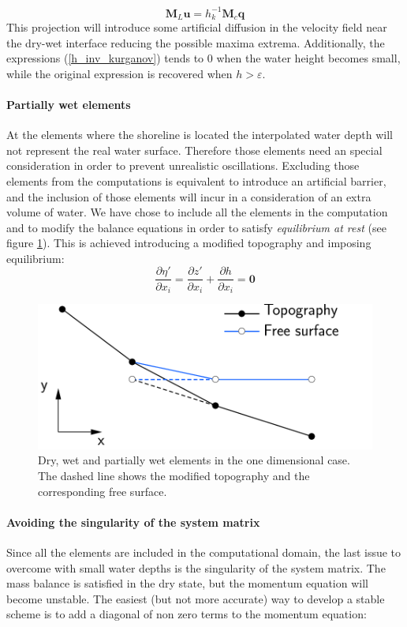 \documentclass[a4paper,12pt]{article}
\newcommand{\pder}[2]{\frac{\partial#1}{\partial#2}}
\begin{document}
\begin{equation}
\mathbf{M}_L \mathbf{u} = h^{-1}_k \mathbf{M}_c \mathbf{q}
\end{equation}
This projection will introduce some artificial diffusion in the velocity field near the dry-wet interface reducing the possible maxima extrema. Additionally, the expressions (\ref{h_inv_kurganov}) tends to $0$ when the water height becomes small, while the original expression is recovered when $h>\varepsilon$.


\paragraph{Partially wet elements}
At the elements where the shoreline is located the interpolated water depth will not represent the real water surface. Therefore those elements need an special consideration in order to prevent unrealistic oscillations. Excluding those elements from the computations is equivalent to introduce an artificial barrier, and the inclusion of those elements will incur in a consideration of an extra volume of water. We have chose to include all the elements in the computation and to modify the balance equations in order to satisfy \emph{equilibrium at rest} (see figure \ref{partially_dry}). This is achieved introducing a modified topography and imposing equilibrium:
\begin{equation}
    \pder{\eta'}{x_i} = \pder{z'}{x_i} + \pder{h}{x_i} = \mathbf{0}
\end{equation}

\begin{figure}
    \centering
    \includegraphics[width=.5\textwidth]{img/fig/partially_dry.pdf}
    \caption{Dry, wet and partially wet elements in the one dimensional case. The dashed line shows the modified topography  and the corresponding free surface.}
    \label{partially_dry}
\end{figure}

\paragraph{Avoiding the singularity of the system matrix}
Since all the elements are included in the computational domain, the last issue to overcome with small water depths is the singularity of the system matrix. The mass balance is satisfied in the dry state, but the momentum equation will become unstable. The easiest (but not more accurate) way to develop a stable scheme is to add a diagonal of non zero terms to the momentum equation:
\end{document}
